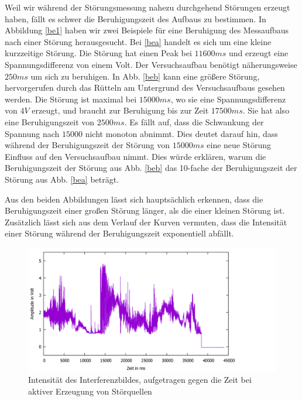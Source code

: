\documentclass[12pt,a4paper]{article}
\begin{document}
Weil wir während der Störungsmessung nahezu durchgehend Störungen erzeugt haben, fällt es schwer die Beruhigungszeit des Aufbaus zu bestimmen. In Abbildung \ref{be1} haben wir zwei Beispiele für eine Beruhigung des Messaufbaus nach einer Störung herausgesucht. Bei \ref{bea} handelt es sich um eine kleine kurzzeitige Störung. Die Störung hat einen Peak bei $11600ms$ und erzeugt eine Spannungsdifferenz von einem Volt. Der Versuchsaufbau benötigt näherungsweise $250ms$ um sich zu beruhigen. In Abb. \ref{beb} kann eine größere Störung, hervorgerufen durch das Rütteln am Untergrund des Versuchsaufbaus gesehen werden. Die Störung ist maximal bei $15000ms$, wo sie eine Spannungsdifferenz von $4V$ erzeugt, und braucht zur Beruhigung bis zur Zeit $17500ms$. Sie hat also eine Beruhigungszeit von $2500ms$. Es fällt auf, dass die Schwankung der Spannung nach $15000$ nicht monoton abnimmt. Dies deutet darauf hin, dass während der Beruhigungszeit der Störung von $15000ms$ eine neue Störung Einfluss auf den Versuchsaufbau nimmt. Dies würde erklären, warum die Beruhigungszeit der Störung aus Abb. \ref{beb} das 10-fache der Beruhigungszeit der Störung aus Abb. \ref{bea} beträgt. 

Aus den beiden Abbildungen lässt sich hauptsächlich erkennen, dass die Beruhigungszeit einer großen Störung länger, als die einer kleinen Störung ist. Zusätzlich lässt sich aus dem Verlauf der Kurven vermuten, dass die Intensität einer Störung während der Beruhigungszeit exponentiell abfällt.

\begin{figure}[h]
	\centering
	\includegraphics[scale = 0.26]{storung.png}
	\caption{Intensität des Interferenzbildes, aufgetragen gegen die Zeit bei aktiver Erzeugung von Störquellen}
	\label{stor1}
\end{figure}
\end{document}
